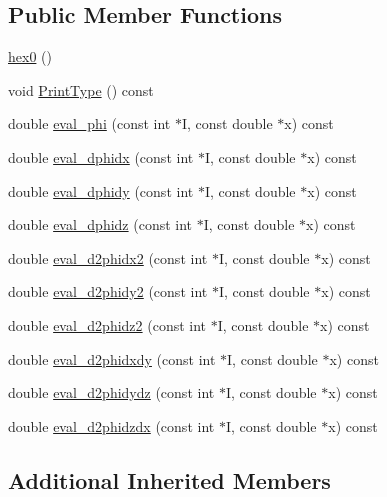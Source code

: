 \subsection*{Public Member Functions}
\begin{DoxyCompactItemize}
\item 
\mbox{\hyperlink{classfemus_1_1hex0_af7dde8d364c2f19cc1aa5e69192801e4}{hex0}} ()
\item 
void \mbox{\hyperlink{classfemus_1_1hex0_acd0623cd092781f05f3604e102fabe63}{Print\+Type}} () const
\item 
double \mbox{\hyperlink{classfemus_1_1hex0_ad2737dbc2c4036ac4920582adde2de2c}{eval\+\_\+phi}} (const int $\ast$I, const double $\ast$x) const
\item 
double \mbox{\hyperlink{classfemus_1_1hex0_a6af64d193c685d7d54a589f9cee5a24b}{eval\+\_\+dphidx}} (const int $\ast$I, const double $\ast$x) const
\item 
double \mbox{\hyperlink{classfemus_1_1hex0_a8db705e3c8fdcc9b628fe8ce168c91bb}{eval\+\_\+dphidy}} (const int $\ast$I, const double $\ast$x) const
\item 
double \mbox{\hyperlink{classfemus_1_1hex0_a9273324eeab48b6d166b11f167e89de1}{eval\+\_\+dphidz}} (const int $\ast$I, const double $\ast$x) const
\item 
double \mbox{\hyperlink{classfemus_1_1hex0_af280499bcecfb346586a8a5aca7bc152}{eval\+\_\+d2phidx2}} (const int $\ast$I, const double $\ast$x) const
\item 
double \mbox{\hyperlink{classfemus_1_1hex0_a16cfc0e738c48d75e558479d4da76aa4}{eval\+\_\+d2phidy2}} (const int $\ast$I, const double $\ast$x) const
\item 
double \mbox{\hyperlink{classfemus_1_1hex0_a8b54d2de54c8c30de2ead325c661a428}{eval\+\_\+d2phidz2}} (const int $\ast$I, const double $\ast$x) const
\item 
double \mbox{\hyperlink{classfemus_1_1hex0_a6fa5e53143dc6f1d3d41a63a26d7ac59}{eval\+\_\+d2phidxdy}} (const int $\ast$I, const double $\ast$x) const
\item 
double \mbox{\hyperlink{classfemus_1_1hex0_a925359d6a2443d05fa45262a8a8da65c}{eval\+\_\+d2phidydz}} (const int $\ast$I, const double $\ast$x) const
\item 
double \mbox{\hyperlink{classfemus_1_1hex0_a7ccc33fa4e1701fbbae72b174c7ca4f1}{eval\+\_\+d2phidzdx}} (const int $\ast$I, const double $\ast$x) const
\end{DoxyCompactItemize}
\subsection*{Additional Inherited Members}


